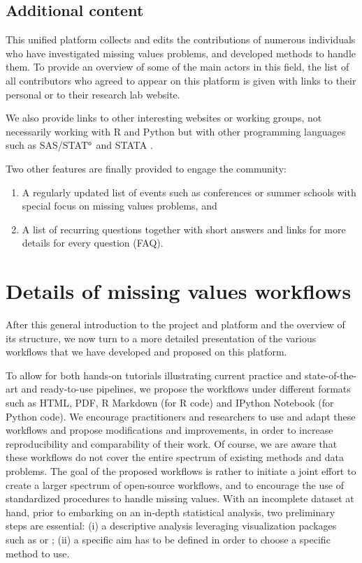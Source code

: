 \subsection{Additional content}

This unified platform collects and edits the contributions of numerous individuals who have investigated missing values problems, and developed methods to handle them. To
provide an overview of some of the main actors in this field, the list of all
contributors who agreed to appear on this platform is given with links to their
personal or to their research lab website.

We also provide links to other interesting websites or working groups, not 
necessarily working with {R} and {Python} \citep{python} but with other programming languages such as 
SAS/STAT$^{\textrm{\tiny\textregistered}}$ and STATA \citep{stata}.

Two other features are finally provided to engage the community:
\begin{enumerate}
  \item A regularly updated list of events such as conferences or summer 
schools with special focus on missing values problems, and
  \item A list of recurring questions together with short answers and links for 
more details for every question (FAQ).
\end{enumerate}

\section{Details of missing values workflows} \label{sec:workflows}

After this general introduction to the  project and platform and the overview of its structure, we now turn to a more detailed presentation of the various workflows that we have developed and proposed on this platform. 

To allow for both hands-on tutorials illustrating current practice and state-of-the-art and ready-to-use pipelines, we propose the workflows under different formats such as HTML, PDF, {R} Markdown (for {R} code) and IPython Notebook (for {Python} code). %
We encourage practitioners and researchers to
use and adapt these workflows and propose modifications and improvements, in order to increase reproducibility and comparability of their work. Of course, we are aware that these workflows do not cover the entire spectrum of existing methods 
and data problems. The goal of the proposed workflows is rather to initiate a joint effort to create a larger spectrum of open-source workflows, and to encourage the use of standardized procedures to handle missing values. 
With an incomplete dataset at hand, prior to embarking on an in-depth statistical analysis, two preliminary steps are essential: (i) a descriptive analysis leveraging visualization packages such as  \citep{VIM} or  \citep{naniar}; (ii) a specific aim has to be defined in order to choose a specific method to use. 

